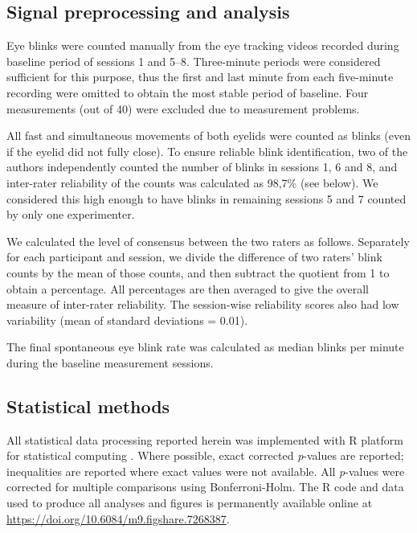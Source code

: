 \documentclass[fleqn,10pt]{wlscirep}
\begin{document}
\subsection*{Signal preprocessing and analysis}
Eye blinks were counted manually from the eye tracking videos recorded during baseline period of sessions 1 and 5--8. Three-minute periods were considered sufficient for this purpose, thus the first and last minute from each five-minute recording were omitted to obtain the most stable period of baseline. Four measurements (out of 40) were excluded due to measurement problems.

All fast and simultaneous movements of both eyelids were counted as blinks (even if the eyelid did not fully close). To ensure reliable blink identification, two of the authors independently counted the number of blinks in sessions 1, 6 and 8, and inter-rater reliability of the counts was calculated as 98,7\% (see below). We considered this high enough to have blinks in remaining sessions 5 and 7 counted by only one experimenter.

We calculated the level of consensus between the two raters as follows. Separately for each participant and session, we divide the difference of two raters' blink counts by the mean of those counts, and then subtract the quotient from 1 to obtain a percentage. All percentages are then averaged to give the overall measure of inter-rater reliability. The session-wise reliability scores also had low variability (mean of standard deviations = 0.01).

The final spontaneous eye blink rate was calculated as median blinks per minute during the
baseline measurement sessions.

\subsection*{Statistical methods}
All statistical data processing reported herein was implemented with {\sf R} platform for statistical computing \cite{R2014}. Where possible, exact corrected {\it p}-values are reported; inequalities are reported where exact values were not available. All {\it p}-values were corrected for multiple comparisons using Bonferroni-Holm. The {\sf R} code and data used to produce all analyses and figures is permanently available online at \url{https://doi.org/10.6084/m9.figshare.7268387}.
\end{document}
